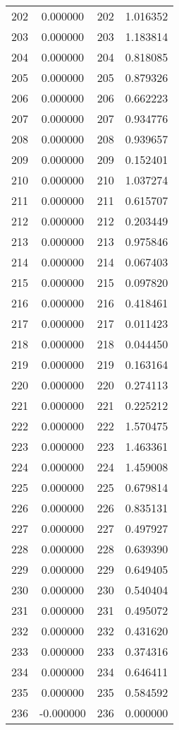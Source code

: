 \documentclass[12pt]{article}
\begin{document}
\begin{longtable}{@{}cccc@{}}
202 & 0.000000 & 202 & 1.016352 \\
203 & 0.000000 & 203 & 1.183814 \\
204 & 0.000000 & 204 & 0.818085 \\
205 & 0.000000 & 205 & 0.879326 \\
206 & 0.000000 & 206 & 0.662223 \\
207 & 0.000000 & 207 & 0.934776 \\
208 & 0.000000 & 208 & 0.939657 \\
209 & 0.000000 & 209 & 0.152401 \\
210 & 0.000000 & 210 & 1.037274 \\
211 & 0.000000 & 211 & 0.615707 \\
212 & 0.000000 & 212 & 0.203449 \\
213 & 0.000000 & 213 & 0.975846 \\
214 & 0.000000 & 214 & 0.067403 \\
215 & 0.000000 & 215 & 0.097820 \\
216 & 0.000000 & 216 & 0.418461 \\
217 & 0.000000 & 217 & 0.011423 \\
218 & 0.000000 & 218 & 0.044450 \\
219 & 0.000000 & 219 & 0.163164 \\
220 & 0.000000 & 220 & 0.274113 \\
221 & 0.000000 & 221 & 0.225212 \\
222 & 0.000000 & 222 & 1.570475 \\
223 & 0.000000 & 223 & 1.463361 \\
224 & 0.000000 & 224 & 1.459008 \\
225 & 0.000000 & 225 & 0.679814 \\
226 & 0.000000 & 226 & 0.835131 \\
227 & 0.000000 & 227 & 0.497927 \\
228 & 0.000000 & 228 & 0.639390 \\
229 & 0.000000 & 229 & 0.649405 \\
230 & 0.000000 & 230 & 0.540404 \\
231 & 0.000000 & 231 & 0.495072 \\
232 & 0.000000 & 232 & 0.431620 \\
233 & 0.000000 & 233 & 0.374316 \\
234 & 0.000000 & 234 & 0.646411 \\
235 & 0.000000 & 235 & 0.584592 \\
236 & -0.000000 & 236 & 0.000000 \\

\end{longtable}
\end{document}
